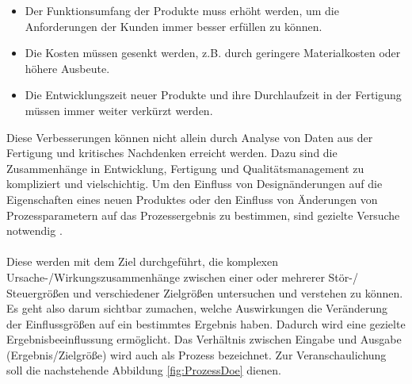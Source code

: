 \documentclass[
fontsize=10pt, 
listof = totoc,
parskip = half	
]{report}
\begin{document}
\begin{itemize}
	\item Der Funktionsumfang der Produkte muss erhöht werden, um die Anforderungen der Kunden immer besser erfüllen zu können.
	\item Die Kosten müssen gesenkt werden, z.B. durch geringere Materialkosten oder höhere
	Ausbeute.
	\item Die Entwicklungszeit neuer Produkte und ihre Durchlaufzeit in der Fertigung müssen
	immer weiter verkürzt werden.
\end{itemize}

\noindent Diese Verbesserungen können nicht allein durch Analyse von Daten aus der Fertigung und kritisches Nachdenken erreicht werden. Dazu sind die Zusammenhänge in Entwicklung, Fertigung und Qualitätsmanagement zu kompliziert und vielschichtig. Um den Einfluss von Designänderungen auf die Eigenschaften eines neuen Produktes oder den Einfluss von Änderungen von Prozessparametern auf das Prozessergebnis zu bestimmen,
sind gezielte Versuche notwendig \cite{kleppmann_2020}.
\\\\
\noindent Diese werden mit dem Ziel durchgeführt, die komplexen Ursache-/Wirkungszusammenhänge zwischen einer oder mehrerer Stör-/ Steuergrößen und verschiedener Zielgrößen untersuchen und verstehen zu können. Es geht also darum sichtbar zumachen, welche Auswirkungen die Veränderung der Einflussgrößen auf ein bestimmtes Ergebnis haben. Dadurch wird eine gezielte Ergebnisbeeinflussung ermöglicht. Das Verhältnis zwischen Eingabe und Ausgabe (Ergebnis/Zielgröße) wird auch als Prozess bezeichnet. Zur Veranschaulichung soll die nachstehende Abbildung \ref{fig:ProzessDoe} dienen.
\end{document}
